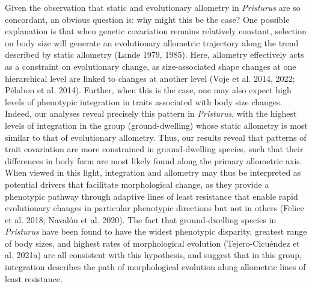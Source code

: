 \documentclass[
  11pt,
]{article}
\begin{document}
Given the observation that static and evolutionary allometry in
\emph{Pristurus} are so concordant, an obvious question is: why might
this be the case? One possible explanation is that when genetic
covariation remains relatively constant, selection on body size will
generate an evolutionary allometric trajectory along the trend described
by static allometry (Lande 1979, 1985). Here, allometry effectively acts
as a constraint on evolutionary change, as size-associated shape changes
at one hierarchical level are linked to changes at another level (Voje
et al. 2014, 2022; Pélabon et al. 2014). Further, when this is the case,
one may also expect high levels of phenotypic integration in traits
associated with body size changes. Indeed, our analyses reveal precisely
this pattern in \emph{Pristurus}, with the highest levels of integration
in the group (ground-dwelling) whose static allometry is most similar to
that of evolutionary allometry. Thus, our results reveal that patterns
of trait covariation are more constrained in ground-dwelling species,
such that their differences in body form are most likely found along the
primary allometric axis. When viewed in this light, integration and
allometry may thus be interpreted as potential drivers that facilitate
morphological change, as they provide a phenotypic pathway through
adaptive lines of least resistance that enable rapid evolutionary
changes in particular phenotypic directions but not in others (Felice et
al. 2018; Navalón et al. 2020). The fact that ground-dwelling species in
\emph{Pristurus} have been found to have the widest phenotypic
disparity, greatest range of body sizes, and highest rates of
morphological evolution (Tejero-Cicuéndez et al. 2021a) are all
consistent with this hypothesis, and suggest that in this group,
integration describes the path of morphological evolution along
allometric lines of least resistance. \hfill\break
\end{document}

